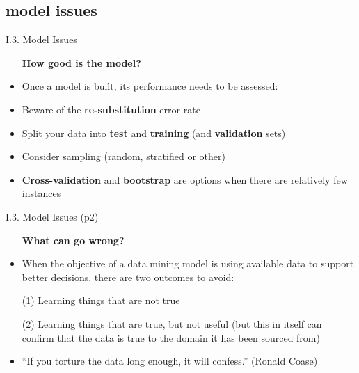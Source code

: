 \documentclass[handout]{beamer}
\newcommand{\strong}[1]{\textbf{\color{teal} #1}}
\newcommand{\stronger}[1]{\textbf{\color{purple} #1}}
\begin{document}
\subsection{model issues}
\begin{frame}{I.3. Model Issues}
\begin{itemize}
\item[] \strong{How good is the model?}
\item[]
\item Once a model is built, its performance needs to be assessed:
\item Beware of the \stronger{re-substitution} error rate
\item Split your data into \stronger{test} and \stronger{training} (and \stronger{validation} sets)
\item Consider sampling (random, stratified or other)
\item \stronger{Cross-validation} and \stronger{bootstrap} are options when there are relatively few instances
\end{itemize}
\end{frame}
\begin{frame}{I.3. Model Issues (p2)}
\begin{itemize}
\item[] \strong{What can go wrong?}
\item[]
\item When the objective of a data mining model is using available data to support better decisions, there are two outcomes to avoid:
\item[(1)] Learning things that are not true
\item[(2)] Learning things that are true, but not useful
(but this in itself can confirm that the data is true to the domain it has been sourced from)
\item ``If you torture the data long enough, it will confess.'' (Ronald Coase\cite{tullock:2001})
\end{itemize}
\end{frame}
\end{document}
